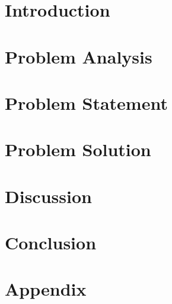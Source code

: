 
\usepackage{booktabs} %


\cleardoublepage
\cleardoublepage

\cleardoublepage
\tableofcontents

\chapter{Introduction}
%

\chapter{Problem Analysis}

\chapter{Problem Statement}

\chapter{Problem Solution}


\chapter{Discussion}


\chapter{Conclusion}

\label{lastpage}

\appendix
\chapter{Appendix}

